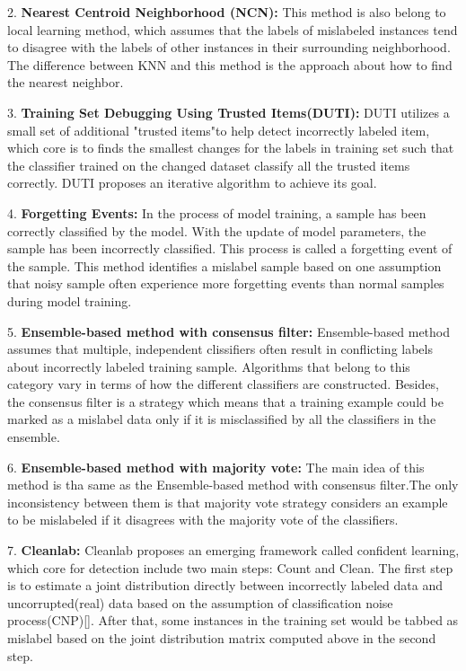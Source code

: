 2. \textbf{Nearest Centroid Neighborhood (NCN):} This method is also belong to local learning method, which assumes that the labels of mislabeled instances tend to disagree with the labels of other instances in their surrounding neighborhood. The difference between KNN and this method is the approach about how to find the nearest neighbor.

3. \textbf{Training Set Debugging Using Trusted Items(DUTI):} DUTI utilizes a small set of additional "trusted items"to help detect incorrectly labeled item, which core is to finds the smallest changes for the labels in training set such that the classifier trained on the changed dataset classify all the trusted items correctly. DUTI proposes an iterative algorithm to achieve its goal.

4. \textbf{Forgetting Events:} In the process of model training, a sample has been correctly classified by the model. With the update of model parameters, the sample has been incorrectly classified. This process is called a forgetting event of the sample. This method identifies a mislabel sample based on one assumption that noisy sample often experience more forgetting events than normal samples during model training. 

5. \textbf{Ensemble-based method with consensus filter:}  Ensemble-based method assumes that multiple, independent clissifiers often result in conflicting labels about incorrectly labeled training sample. Algorithms that belong to this category vary in terms of how the different classifiers are constructed. Besides, the consensus filter is a strategy which means that a training example could be marked as a mislabel data only if it is misclassified by all the classifiers in the ensemble.

6. \textbf{Ensemble-based method with majority vote:}  The main idea of this method is tha same as the Ensemble-based method with consensus filter.The only inconsistency between them is that majority vote strategy considers an example to be mislabeled if it disagrees with the majority vote of the classifiers.

7. \textbf{Cleanlab:} Cleanlab proposes an emerging framework called confident learning, which core for detection include two main steps: Count and Clean. The first step is to estimate a joint distribution directly between incorrectly labeled data and uncorrupted(real) data based on the assumption of classification noise process(CNP)[]. After that, some instances in the training set would be tabbed as mislabel based on the joint distribution matrix computed above in the second step.


